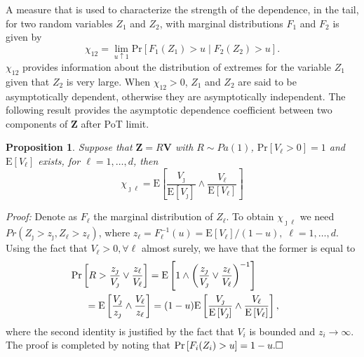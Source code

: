 \documentclass[iicol,sn-basic]{sn-jnl}
\newtheorem{prop}{Proposition}
\newcommand{\prob}[1]{\text{Pr}\left[#1\right]}
\newcommand{\expect}[1]{\text{E}\left[#1\right]}
\theoremstyle{thmstyleone}
\begin{document}
A measure that is used to characterize the strength of the dependence, in the tail, for two random variables $Z_1$ and $Z_2$, with marginal distributions $F_1$ and $F_2$ is given by \citep{coles2001}
\[
\chi_{12} = \lim\limits_{u\uparrow 1} \prob{F_1(Z_1)>u\mid F_2(Z_2)>u}.
\]
$\chi_{12}$ provides information about the distribution of extremes for the variable $Z_1$ given that $Z_2$ is very large.  When $\chi_{12}>0$, $Z_1$ and $Z_2$ are said to be asymptotically dependent, otherwise they are asymptotically independent. The following result provides the asymptotic dependence coefficient between two components of $\bm{Z}$ after PoT limit.
\begin{prop}\label{ppchi}
Suppose that $\bm{Z} = R\bm{V}$ with $R\sim Pa(1)$,
$\prob{V_\ell > 0} = 1$ and $\expect{V_\ell}$ exists, for $\ell=1, \ldots ,d$, then
\begin{equation}
\label{eqn:chi_ij}
\chi_{\jmath\ell} = \expect{\frac{V_\jmath}{\expect{V_\jmath}} \wedge \frac{V_\ell}{\expect{V_\ell}}}
\end{equation}
\end{prop}
{\em Proof:}
Denote as $F_\ell$ the marginal distribution of $Z_\ell$. To obtain $\chi_{\jmath\ell}$ we need $Pr(Z_\jmath>z_\jmath,Z_\ell>z_\ell)$, where $z_\ell = F_\ell^{-1}(u) = \expect{V_\ell}/(1 - u), \;\ell=1,\dots, d$.  Using the fact that $V_\ell>0, \forall \ell$ almost surely, we have that the former is equal to
\begin{equation*}
\begin{aligned}
&\hspace{-0.5cm}\prob{R>\frac{z_\jmath}{V_\jmath}\vee\frac{z_\ell}{V_\ell}}
= \expect{1\wedge\left(\frac{z_\jmath}{V_\jmath}\vee\frac{z_\ell}{V_\ell}\right)^{-1}}\\
&= \expect{\frac{V_\jmath}{z_\jmath}\wedge\frac{V_\ell}{z_\ell}}
= (1 - u)\expect{\frac{V_\jmath}{\expect{V_\jmath}}\wedge\frac{V_\ell}{\expect{V_\ell}}},
\end{aligned}
\end{equation*}
where the second identity is justified by the fact that $V_i$ is bounded and $z_i\rightarrow\infty$. The proof is completed by noting that $\prob{F_i(Z_i)>u} = 1 - u. \hfill\Box$
\end{document}
